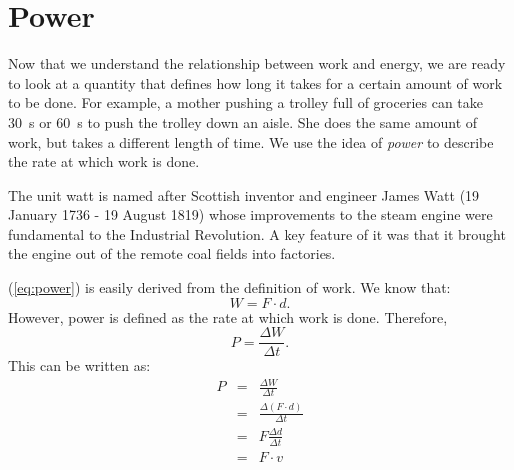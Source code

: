 \section{Power}

Now that we understand the relationship between work and energy, we are ready to look at a quantity that defines how long it takes for a certain amount of work to be done. For example, a mother pushing a trolley full of groceries can take 30~s or 60~s to push the trolley down an aisle. She does the same amount of work, but takes a different length of time. We use the idea of \textit{power} to describe the rate at which work is done.

\begin{IFact}
{The unit watt is named after Scottish inventor and engineer James Watt (19 January 1736 - 19 August 1819) whose improvements to the steam engine were fundamental to the Industrial Revolution. A key feature of it was that it brought the engine out of the remote coal fields into factories.}
\end{IFact}


(\ref{eq:power}) is easily derived from the definition of work. We know that:
\begin{equation*}
W=F\cdot d.
\end{equation*}
However, power is defined as the rate at which work is done. Therefore,
\begin{equation*}
P=\frac{\Delta W}{\Delta t}.
\end{equation*}
This can be written as:
\begin{eqnarray*}
P&=&\frac{\Delta W}{\Delta t}\\
&=&\frac{\Delta(F\cdot d)}{\Delta t}\\
&=&F\frac{\Delta d}{\Delta t}\\
&=&F\cdot v
\end{eqnarray*}

